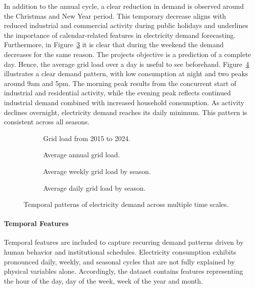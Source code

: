 In addition to the annual cycle, a clear reduction in demand is observed around the Christmas and New Year period. This temporary decrease aligns with reduced industrial and commercial activity during public holidays and underlines the importance of calendar-related features in electricity demand forecasting. Furthermore, in Figure~\ref{fig:average_load_by_day_and_season} it is clear that during the weekend the demand decreases for the same reason. The projects objective is a prediction of a complete day. Hence, the average grid load over a day is useful to see beforehand. Figure~\ref{fig:average_load_by_hour_and_season} illustrates a clear demand pattern, with low consumption at night and two peaks around 9am and 5pm. The morning peak results from the concurrent start of industrial and residential activity, while the evening peak reflects continued industrial demand combined with increased household consumption. As activity declines overnight, electricity demand reaches its daily minimum. This pattern is consistent across all seasons.
\begin{figure}[ht]
    \centering
    \begin{subfigure}[a]{0.49\linewidth}
        \centering
        \caption{Grid load from 2015 to 2024.}
        \label{fig:grid_load_full}
    \end{subfigure}%
    \hfill
    \begin{subfigure}[a]{0.49\linewidth}
        \centering
        \caption{Average annual grid load.}
        \label{fig:grid_load_year}
    \end{subfigure}
    \begin{subfigure}[b]{0.49\linewidth}
        \centering
       \caption{Average weekly grid load by season.}
        \label{fig:average_load_by_day_and_season}
    \end{subfigure}%
    \hfill
    \begin{subfigure}[b]{0.49\linewidth}
        \centering
        \caption{Average daily grid load by season.}
        \label{fig:average_load_by_hour_and_season}
    \end{subfigure}
    \caption{Temporal patterns of electricity demand across multiple time scales.}
    \label{fig:grid_load_overview}
\end{figure}

\paragraph*{Temporal Features}
Temporal features are included to capture recurring demand patterns driven by human behavior and institutional schedules. Electricity consumption exhibits pronounced daily, weekly, and seasonal cycles that are not fully explained by physical variables alone. Accordingly, the dataset contains features representing the hour of the day, day of the week, week of the year and month.

